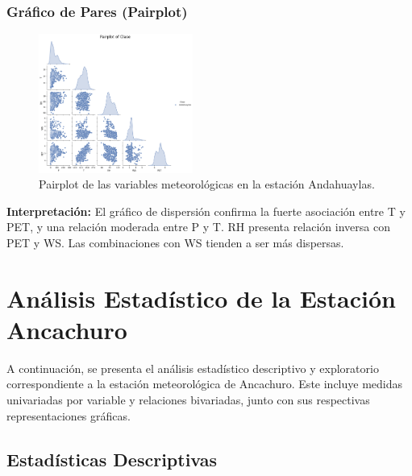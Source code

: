 \subsubsection*{Gráfico de Pares (Pairplot)}
\begin{figure}[H]
\centering
\includegraphics[width=0.45\textwidth]{resultados/por_estacion_meteorologica/Andahuaylas/pairplot.png}
\caption{Pairplot de las variables meteorológicas en la estación Andahuaylas.}
\label{fig:andahuaylas_pairplot}
\end{figure}
\textbf{Interpretación:} El gráfico de dispersión confirma la fuerte asociación entre T y PET, y una relación moderada entre P y T. RH presenta relación inversa con PET y WS. Las combinaciones con WS tienden a ser más dispersas.






\section{Análisis Estadístico de la Estación Ancachuro}

A continuación, se presenta el análisis estadístico descriptivo y exploratorio correspondiente a la estación meteorológica de Ancachuro. Este incluye medidas univariadas por variable y relaciones bivariadas, junto con sus respectivas representaciones gráficas.

\subsection{Estadísticas Descriptivas}

